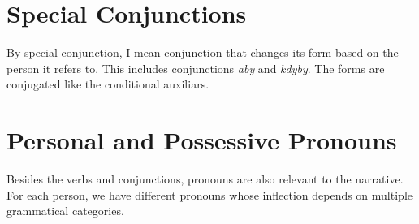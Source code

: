 \section{Special Conjunctions}

By special conjunction, I mean conjunction that changes its form based on the person it refers to. This includes conjunctions \emph{aby} and \emph{kdyby}. The forms are conjugated like the conditional auxiliars.

\section{Personal and Possessive Pronouns}

Besides the verbs and conjunctions, pronouns are also relevant to the narrative. For each person, we have different pronouns whose inflection depends on multiple grammatical categories.


